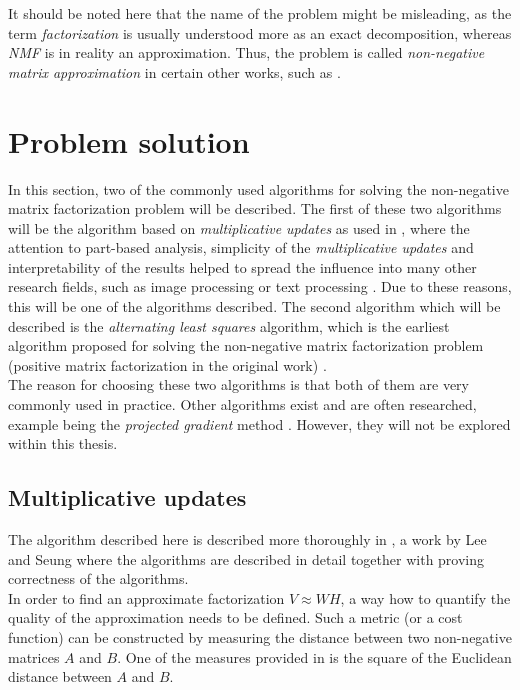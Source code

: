 \documentclass[thesis=M,english]{FITthesis}[2012/10/20]
\begin{document}
It should be noted here that the name of the problem might be misleading, as
the term \emph{factorization} is usually understood more as an exact
decomposition, whereas \emph{NMF} is in reality an approximation. Thus,
the problem is called \emph{non-negative matrix approximation} in certain
other works, such as \cite{nmf-approx}.

\section{Problem solution}
In this section, two of the commonly used algorithms for solving the
non-negative matrix factorization problem will be described. The
first of these two algorithms will be the algorithm based on
\emph{multiplicative updates} as used in \cite{lee99}, where the
attention to part-based analysis, simplicity of the \emph{multiplicative
updates} and interpretability of the results helped to spread the influence
into many other research fields, such as image processing or text
processing \cite{nmf-phd-thesis}. Due to these reasons, this will be one of the algorithms
described. The second algorithm which will be described is the \emph{alternating
least squares} algorithm, which is the earliest algorithm proposed for solving
the non-negative matrix factorization problem (positive matrix factorization
in the original work) \cite{nmf-paatero}.
\\

The reason for choosing these two algorithms is that both of them are very
commonly used in practice. Other algorithms exist and are often researched,
example being the \emph{projected gradient} method \cite{projected-gradient}.
However, they will not be explored within this thesis.

\subsection{Multiplicative updates}
The algorithm described here is described more thoroughly in \cite{lee-algos},
a work by Lee and Seung where the algorithms are described in detail together
with proving correctness of the algorithms.
\\

In order to find an approximate factorization $V \approx WH$, a way how to
quantify the quality of the approximation needs to be defined. Such a metric
(or a cost function) can be constructed by measuring the distance between
two non-negative matrices $A$ and $B$. One of the measures provided in
\cite{lee-algos} is the square of the Euclidean distance between $A$ and $B$.
\end{document}
